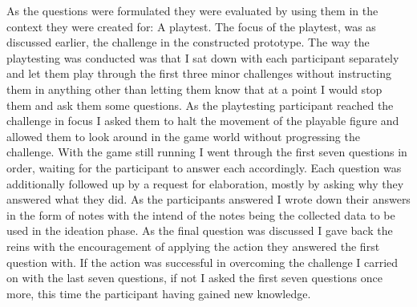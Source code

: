 As the questions were formulated they were evaluated by using them in the context they were created for: A playtest. The focus of the playtest, was as discussed earlier, the challenge in the constructed prototype. The way the playtesting was conducted was that I sat down with each participant separately and let them play through the first three minor challenges without instructing them in anything other than letting them know that at a point I would stop them and ask them some questions. As the playtesting participant reached the challenge in focus I asked them to halt the movement of the playable figure and allowed them to look around in the game world without progressing the challenge. With the game still running I went through the first seven questions in order, waiting for the participant to answer each accordingly. Each question was additionally followed up by a request for elaboration, mostly by asking why they answered what they did. As the participants answered I wrote down their answers in the form of notes with the intend of the notes being the collected data to be used in the ideation phase. As the final question was discussed I gave back the reins with the encouragement of applying the action they answered the first question with. If the action was successful in overcoming the challenge I carried on with the last seven questions, if not I asked the first seven questions once more, this time the participant having gained new knowledge.

